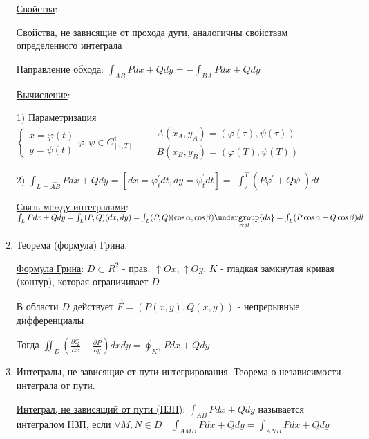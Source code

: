 \documentclass[12pt]{article}
\begin{document}
\begin{enumerate}
        \hyperlink{curvilinearintegraloffirstkindproperties}{Свойства}:

        Свойства, не зависящие от прохода дуги, аналогичны свойствам определенного интеграла

        Направление обхода: $\int_{AB}Pdx + Qdy = -\int_{BA}Pdx + Qdy$

        \hyperlink{curvilinearintegraloffirstkindcalculation}{Вычисление}:

        1) Параметризация $\begin{cases}
            x = \varphi(t) \\
            y = \psi(t)
        \end{cases} \varphi, \psi \in C^1_{[\tau, T]} \quad\quad \begin{matrix}
            A(x_A, y_A) = (\varphi(\tau), \psi(\tau)) \\
            B(x_B, y_B) = (\varphi(T), \psi(T))
        \end{matrix}$

        2) $\int_{L = \overset{\smile}{AB}}Pdx + Qdy = [dx = \varphi_t^\prime dt, dy = \psi_t^\prime dt] = $
        $\int_\tau^T (P\varphi^\prime + Q\psi^\prime)dt$


        \hyperlink{connectionbetweencurvilinearintegrals}{Связь между интегралами}: $\int_L Pdx + Qdy = \int_L (P, Q)(dx, dy) = \int_L (P, Q) (\cos\alpha, \cos\beta) \underset{\approx dl}{\undergroup{ds}} = \int_L (P\cos\alpha + Q\cos\beta)dl$

        \item Теорема (формула) Грина.

        \hyperlink{formulaGreen}{Формула Грина}: $D \subset R^2$ - прав. $\uparrow Ox, \uparrow Oy$, $K$ - гладкая замкнутая кривая (контур), которая ограничивает $D$

        В области $D$ действует $\overrightarrow{F} = (P(x, y), Q(x, y))$ - непрерывные дифференциалы

        Тогда $\iint_D \left(\frac{\partial Q}{\partial x} - \frac{\partial P}{\partial y}\right) dxdy = \oint_{K^+} Pdx + Qdy$

        \item Интегралы, не зависящие от пути интегрирования. Теорема о независимости интеграла от пути.

        \hyperlink{pathindependentintegrals}{Интеграл, не зависящий от пути (НЗП)}: $\int_{AB}Pdx + Qdy$ называется интегралом НЗП, если $\forall M, N \in D \quad \int_{AMB}Pdx + Qdy = \int_{ANB}Pdx + Qdy$


\end{enumerate}
\end{document}
